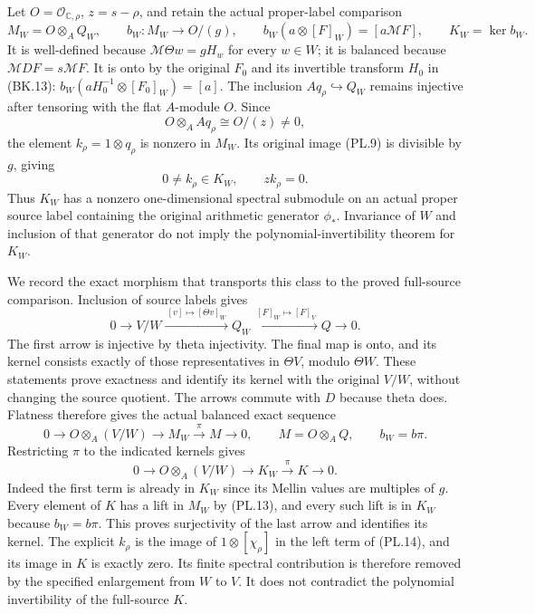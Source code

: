 Let $O=\mathcal O_{\mathbb C,\rho}$, $z=s-\rho$, and retain
the actual proper-label comparison
\[
 M_W=O\otimes_AQ_W,\qquad
 b_W:M_W\longrightarrow O/(g),\qquad
 b_W(a\otimes[F]_W)=[a\mathcal MF],\qquad K_W=\ker b_W.
 \tag{PL.10}
\]
It is well-defined because $\mathcal M\Theta w=gH_w$ for
every $w\in W$; it is balanced because $\mathcal MDF=s\mathcal MF$.
It is onto by the original $F_0$ and its invertible transform $H_0$
in (BK.13): $b_W(aH_0^{-1}\otimes[F_0]_W)=[a]$.
The inclusion $Aq_\rho\hookrightarrow Q_W$ remains injective after
tensoring with the flat $A$-module $O$. Since
\[
 O\otimes_AAq_\rho\cong O/(z)\ne0,
\]
the element $k_\rho=1\otimes q_\rho$ is nonzero in $M_W$.
Its original image (PL.9) is divisible by $g$, giving
\[
 0\ne k_\rho\in K_W,\qquad zk_\rho=0.
 \tag{PL.11}
\]
Thus $K_W$ has a nonzero one-dimensional spectral submodule on an
actual proper source label containing the original arithmetic generator
$\phi_*$. Invariance of $W$ and inclusion of that generator do not
imply the polynomial-invertibility theorem for $K_W$.

We record the exact morphism that transports this class to the
proved full-source comparison. Inclusion of source labels gives
\[
 0\longrightarrow V/W
 \xrightarrow{\ [v]\mapsto[\Theta v]_W\ }
 Q_W\xrightarrow{\ [F]_W\mapsto[F]_V\ }Q
 \longrightarrow0.
 \tag{PL.12}
\]
The first arrow is injective by theta injectivity. The final map
is onto, and its kernel consists exactly of those representatives
in $\Theta V$, modulo $\Theta W$. These statements prove exactness
and identify its kernel with the original $V/W$, without changing
the source quotient. The arrows commute with $D$ because theta
does. Flatness therefore gives the actual balanced exact sequence
\[
 0\longrightarrow O\otimes_A(V/W)\longrightarrow M_W
       \xrightarrow{\pi}M\longrightarrow0,
 \qquad M=O\otimes_AQ,
 \qquad b_W=b\pi.
 \tag{PL.13}
\]
Restricting $\pi$ to the indicated kernels gives
\[
 0\longrightarrow O\otimes_A(V/W)\longrightarrow K_W
       \xrightarrow{\pi}K\longrightarrow0.
 \tag{PL.14}
\]
Indeed the first term is already in $K_W$ since its Mellin values
are multiples of $g$. Every element of $K$ has a lift in $M_W$
by (PL.13), and every such lift is in $K_W$ because $b_W=b\pi$.
This proves surjectivity of the last arrow and identifies its kernel.
The explicit $k_\rho$ is the image of $1\otimes[\chi_\rho]$ in
the left term of (PL.14), and its image in $K$ is exactly zero.
Its finite spectral contribution is therefore removed by the
specified enlargement from $W$ to $V$. It does not contradict
the polynomial invertibility of the full-source $K$.

